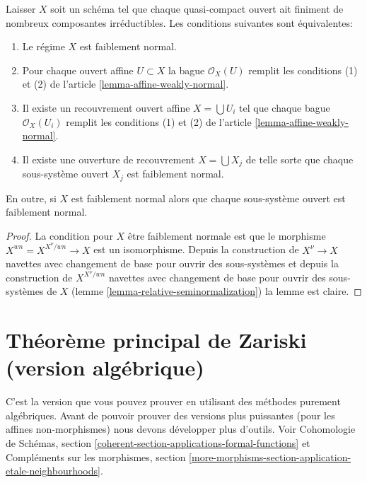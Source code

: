 \begin{lemma}

\label{lemma-locally-weakly-normal}

Laisser $X$ soit un schéma tel que chaque quasi-compact ouvert ait finiment de nombreux composantes irréductibles. Les conditions suivantes sont équivalentes:

\begin{enumerate}

\item Le régime $X$ est faiblement normal.
\item Pour chaque ouvert affine $U \subset X$ la bague $\mathcal{O}_X(U)$
remplit les conditions (1) et (2) de l'article \ref{lemma-affine-weakly-normal}.
\item Il existe un recouvrement ouvert affine $X = \bigcup U_i$ tel que chaque bague $\mathcal{O}_X(U_i)$
remplit les conditions (1) et (2) de l'article \ref{lemma-affine-weakly-normal}.
\item Il existe une ouverture de recouvrement $X = \bigcup X_j$
de telle sorte que chaque sous-système ouvert $X_j$ est faiblement normal.

\end{enumerate}

En outre, si $X$ est faiblement normal alors que chaque sous-système ouvert est faiblement normal.

\end{lemma}

\begin{proof}
La condition pour $X$ être faiblement normale est que le morphisme $X^{wn} = X^{X^\nu/wn} \to X$ est un isomorphisme. Depuis la construction de $X^\nu \to X$ navettes avec changement de base pour ouvrir des sous-systèmes et depuis la construction de $X^{X^\nu/wn}$ navettes avec changement de base pour ouvrir des sous-systèmes de $X$ (lemme \ref{lemma-relative-seminormalization}) la lemme est claire.
\end{proof}










\section{Théorème principal de Zariski (version algébrique)}
\label{section-Zariski}

\noindent
C'est la version que vous pouvez prouver en utilisant des méthodes purement algébriques. Avant de pouvoir prouver des versions plus puissantes (pour les affines non-morphismes) nous devons développer plus d'outils. Voir Cohomologie de Schémas, section \ref{coherent-section-applications-formal-functions} et Compléments sur les morphismes, section \ref{more-morphisms-section-application-etale-neighbourhoods}.

